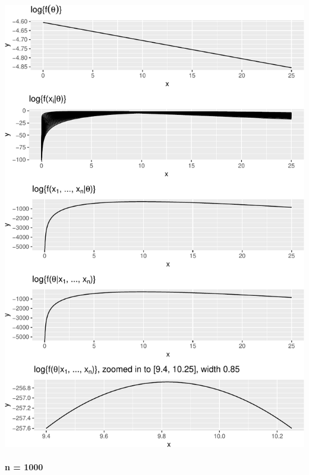 \documentclass[]{article}
\let\oldparagraph\paragraph
\renewcommand{\paragraph}[1]{\oldparagraph{#1}\mbox{}}
\begin{document}
\includegraphics{20190306_log_posterior_contributions_files/figure-latex/unnamed-chunk-6-1.pdf}

\newpage

\paragraph{n = 1000}\label{n-1000}
\end{document}

